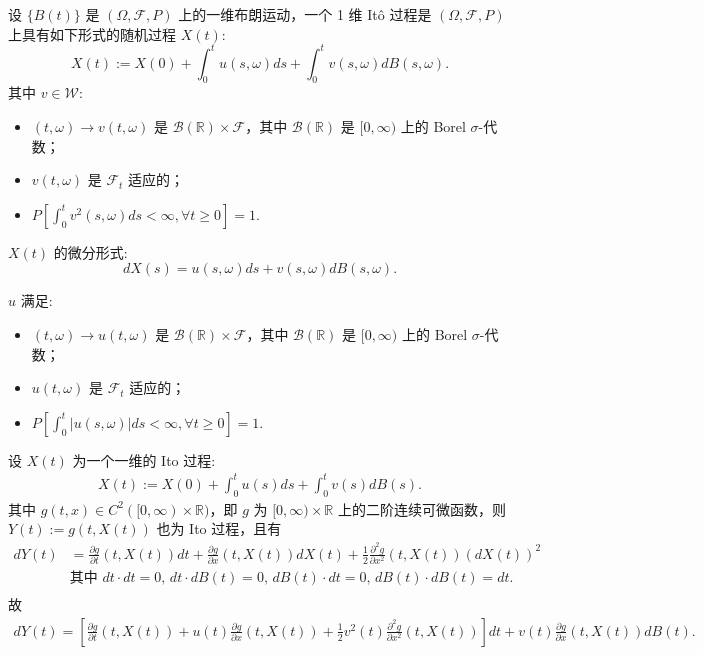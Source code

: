 \documentclass[lang=cn,10pt,thmcnt=section]{elegantbook}
\begin{document}
\begin{definition}
	设 \( \{B(t)\} \) 是 \( (\Omega, \mathcal{F}, P) \) 上的一维布朗运动，一个 1 维 Itô 过程是 \( (\Omega, \mathcal{F}, P) \) 上具有如下形式的随机过程 \( X(t) \):
\[
X(t) := X(0) + \int_0^t u(s, \omega) ds + \int_0^t v(s, \omega) dB(s, \omega).
\]
其中 \( v \in \mathcal{W} \):
\begin{itemize}
    \item \( (t, \omega) \rightarrow v(t, \omega) \) 是 \( \mathcal{B}(\mathbb{R}) \times \mathcal{F} \)，其中 \( \mathcal{B}(\mathbb{R}) \) 是 \([0, \infty)\) 上的 Borel \(\sigma\)-代数；
    \item \( v(t, \omega) \) 是 \( \mathcal{F}_t \) 适应的；
    \item \( P\left[\int_0^t v^2(s, \omega) ds < \infty, \forall t \geq 0\right] = 1 \).
\end{itemize}
\( X(t) \) 的微分形式:
\[
dX(s) = u(s, \omega) ds + v(s, \omega) dB(s, \omega).
\]

\( u \) 满足:
\begin{itemize}
    \item \( (t, \omega) \rightarrow u(t, \omega) \) 是 \( \mathcal{B}(\mathbb{R}) \times \mathcal{F} \)，其中 \( \mathcal{B}(\mathbb{R}) \) 是 \([0, \infty)\) 上的 Borel \(\sigma\)-代数；
    \item \( u(t, \omega) \) 是 \( \mathcal{F}_t \) 适应的；
    \item \( P\left[\int_0^t |u(s, \omega)| ds < \infty, \forall t \geq 0\right] = 1 \).
\end{itemize}
\end{definition}

\begin{theorem}
	设 \( X(t) \) 为一个一维的 Ito 过程:
	\begin{align*}
	X(t) := X(0) + \int_0^t u(s) ds + \int_0^t v(s) dB(s).
	\end{align*}
	其中 \(g(t, x) \in C^2([0, \infty) \times \mathbb{R})\)，即 \(g\) 为 \([0, \infty) \times \mathbb{R}\) 上的二阶连续可微函数，则 \(Y(t) := g(t, X(t))\) 也为 Ito 过程，且有
	\begin{align*}
	dY(t) &= \frac{\partial g}{\partial t}(t, X(t)) dt + \frac{\partial g}{\partial x}(t, X(t)) dX(t) + \frac{1}{2} \frac{\partial^2 g}{\partial x^2}(t, X(t)) (dX(t))^2 \\
	&\text{其中 } dt \cdot dt = 0,\, dt \cdot dB(t) = 0,\, dB(t) \cdot dt = 0,\, dB(t) \cdot dB(t) = dt. \\
	\end{align*}
	故
	\begin{align*}
	dY(t) = \left[ \frac{\partial g}{\partial t}(t, X(t)) + u(t) \frac{\partial g}{\partial x}(t, X(t)) + \frac{1}{2} v^2(t) \frac{\partial^2 g}{\partial x^2}(t, X(t))\right] dt + v(t) \frac{\partial g}{\partial x}(t, X(t)) dB(t).
	\end{align*}
\end{theorem}
\end{document}
